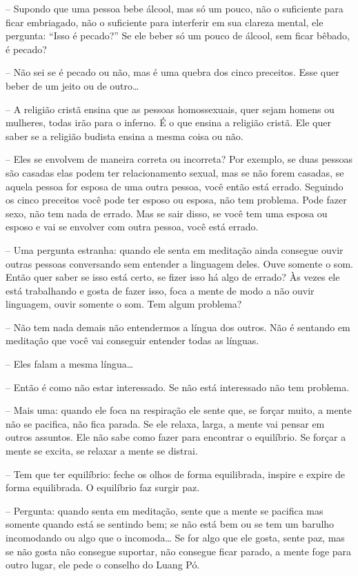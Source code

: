 -- Supondo que uma pessoa bebe álcool, mas só um pouco, não o
suficiente para ficar embriagado, não o suficiente para interferir em
sua clareza mental, ele pergunta: “Isso é pecado?” Se ele beber só um
pouco de álcool, sem ficar bêbado, é pecado?

-- Não sei se é pecado ou não, mas é uma quebra dos cinco
preceitos. Esse quer beber de um jeito ou de outro\ldots{}

-- A religião cristã ensina que as pessoas homossexuais, quer sejam
homens ou mulheres, todas irão para o inferno. É o que ensina a
religião cristã. Ele quer saber se a religião budista ensina a mesma
coisa ou não.

-- Eles se envolvem de maneira correta ou incorreta? Por exemplo,
se duas pessoas são casadas elas podem ter relacionamento sexual, mas
se não forem casadas, se aquela pessoa for esposa de uma outra pessoa,
você então está errado. Seguindo os cinco preceitos você pode ter
esposo ou esposa, não tem problema. Pode fazer sexo, não tem nada de
errado. Mas se sair disso, se você tem uma esposa ou esposo e vai se
envolver com outra pessoa, você está errado.

-- Uma pergunta estranha: quando ele senta em meditação ainda
consegue ouvir outras pessoas conversando sem entender a linguagem
deles. Ouve somente o som. Então quer saber se isso está certo, se
fizer isso há algo de errado? Às vezes ele está trabalhando e gosta de
fazer isso, foca a mente de modo a não ouvir linguagem, ouvir somente o
som. Tem algum problema?

-- Não tem nada demais não entendermos a língua dos outros. Não é
sentando em meditação que você vai conseguir entender todas as línguas.

-- Eles falam a mesma língua\ldots{}

-- Então é como não estar interessado. Se não está interessado não
tem problema.

-- Mais uma: quando ele foca na respiração ele sente que, se forçar
muito, a mente não se pacifica, não fica parada. Se ele relaxa, larga,
a mente vai pensar em outros assuntos. Ele não sabe como fazer para
encontrar o equilíbrio. Se forçar a mente se excita, se relaxar a mente
se distrai.

-- Tem que ter equilíbrio: feche os olhos de forma equilibrada,
inspire e expire de forma equilibrada. O equilíbrio faz surgir paz.

-- Pergunta: quando senta em meditação, sente que a mente se
pacifica mas somente quando está se sentindo bem; se não está bem ou se
tem um barulho incomodando ou algo que o incomoda\ldots{} Se for algo que ele
gosta, sente paz, mas se não gosta não consegue suportar, não consegue
ficar parado, a mente foge para outro lugar, ele pede o conselho do
Luang Pó.

